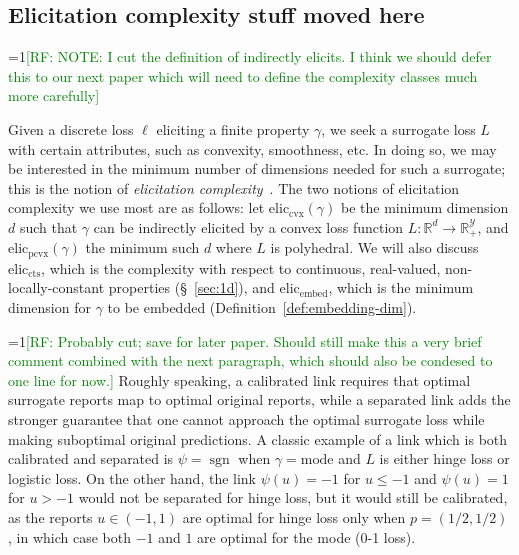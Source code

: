 \documentclass[12pt]{article}
\newcommand{\Comments}{1}
\newcommand{\mynote}[2]{\ifnum\Comments=1\textcolor{#1}{#2}\fi}
\newcommand{\raf}[1]{\mynote{green}{[RF: #1]}}
\newcommand{\reals}{\mathbb{R}}
\newcommand{\prop}[1]{\Gamma[#1]}
\newcommand{\eliccts}{\mathrm{elic}_\mathrm{cts}}
\newcommand{\eliccvx}{\mathrm{elic}_\mathrm{cvx}}
\newcommand{\elicpoly}{\mathrm{elic}_\mathrm{pcvx}}
\newcommand{\elicembed}{\mathrm{elic}_\mathrm{embed}}
\newcommand{\mode}{\mathrm{mode}}
\newcommand{\Y}{\mathcal{Y}}
\DeclareMathOperator*{\sgn}{sgn}
\newtheorem{definition}{Definition}
\begin{document}
\subsection*{Elicitation complexity stuff moved here}

\raf{NOTE: I cut the definition of indirectly elicits.  I think we should defer this to our next paper which will need to define the complexity classes much more carefully}




Given a discrete loss $\ell$ eliciting a finite property $\gamma$, we seek a surrogate loss $L$ with certain attributes, such as convexity, smoothness, etc.
In doing so, we may be interested in the minimum number of dimensions needed for such a surrogate; this is the notion of \emph{elicitation complexity}~\citep{lambert2008eliciting,fissler2016higher,frongillo2015elicitation}.
The two notions of elicitation complexity we use most are as follows: let $\eliccvx(\gamma)$ be the minimum dimension $d$ such that $\gamma$ can be indirectly elicited by a convex loss function $L: \reals^d \to \reals^\Y_+$, and $\elicpoly(\gamma)$ the minimum such $d$ where $L$ is polyhedral.
We will also discuss $\eliccts$, which is the complexity with respect to continuous, real-valued, non-locally-constant properties (\S~\ref{sec:1d}), and $\elicembed$, which is the minimum dimension for $\gamma$ to be embedded (Definition~\ref{def:embedding-dim}).

\raf{Probably cut; save for later paper.  Should still make this a very brief comment combined with the next paragraph, which should also be condesed to one line for now.}
Roughly speaking, a calibrated link requires that optimal surrogate reports map to optimal original reports, while a separated link adds the stronger guarantee that one cannot approach the optimal surrogate loss while making suboptimal original predictions.
A classic example of a link which is both calibrated and separated is $\psi = \sgn$ when $\gamma=\mode$ and $L$ is either hinge loss or logistic loss.
On the other hand, the link $\psi(u) =-1$ for $u \leq -1$ and $\psi(u) = 1$ for $u > -1$
would not be separated for hinge loss, but it would still be calibrated, as the reports $u\in(-1,1)$ are optimal for hinge loss only when $p=(1/2,1/2)$, in which case both $-1$ and $1$ are optimal for the mode (0-1 loss).
\end{document}
